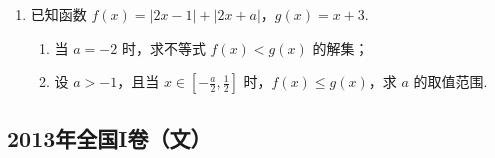 \begin{description}
\begin{enumerate}[leftmargin=5pt]
        \item 已知函数 \( f(x) = |2x - 1| + |2x + a| \)，\( g(x) = x + 3 \).
\begin{enumerate}
\item 当 \(a = -2\) 时，求不等式 \(f(x) < g(x)\) 的解集；
\item 设 \(a > -1\)，且当 \(x \in \left[-\frac{a}{2}, \frac{1}{2}\right]\) 时，\(f(x) \leqslant g(x)\)，求 \(a\) 的取值范围.
\end{enumerate}

    \end{enumerate}

\end{description}


\subsection{2013年全国I卷（文）}\label{gk:2013年全国I卷（文）}

